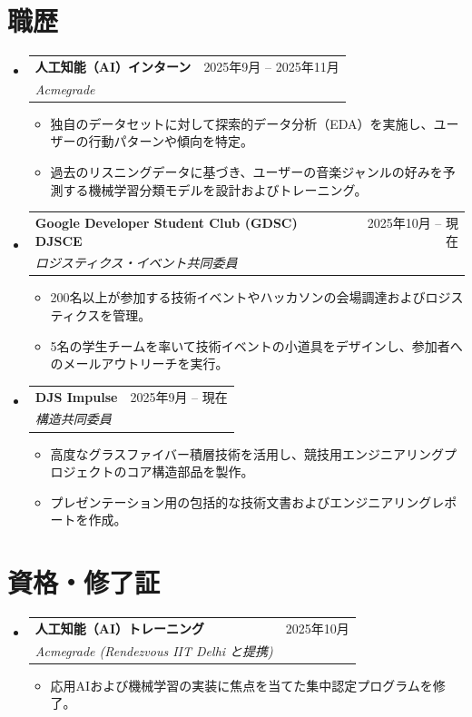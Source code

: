 \documentclass[letterpaper,11pt]{article}
\makeatletter
\newcommand{\resumeItem}[1]{
  \item\small{#1}
}
\newcommand{\resumeSubheading}[4]{
  \item
    \begin{tabular*}{0.97\textwidth}[t]{l@{\extracolsep{\fill}}r}
      \textbf{#1} & #2 \\[2pt]
      \textit{\small#3} & \textit{\small #4} \\
    \end{tabular*}\vspace{1pt}
}
\newcommand{\resumeSubHeadingListStart}{\begin{itemize}[leftmargin=0.15in, label={}, itemsep=5pt, parsep=0pt]}
\newcommand{\resumeSubHeadingListEnd}{\end{itemize}}
\newcommand{\resumeItemListStart}{\begin{itemize}[itemsep=2pt, parsep=0pt, topsep=0pt, partopsep=0pt]}
\newcommand{\resumeItemListEnd}{\end{itemize}}
\makeatother
\begin{document}
\section{職歴}
  \resumeSubHeadingListStart
    \resumeSubheading
      {人工知能（AI）インターン}{2025年9月 -- 2025年11月}
      {Acmegrade}{}
      \resumeItemListStart
        \resumeItem{独自のデータセットに対して探索的データ分析（EDA）を実施し、ユーザーの行動パターンや傾向を特定。}
        \resumeItem{過去のリスニングデータに基づき、ユーザーの音楽ジャンルの好みを予測する機械学習分類モデルを設計およびトレーニング。}
      \resumeItemListEnd
    \resumeSubheading
      {Google Developer Student Club (GDSC) DJSCE}{2025年10月 -- 現在}
      {ロジスティクス・イベント共同委員}{}
      \resumeItemListStart
        \resumeItem{200名以上が参加する技術イベントやハッカソンの会場調達およびロジスティクスを管理。}
        \resumeItem{5名の学生チームを率いて技術イベントの小道具をデザインし、参加者へのメールアウトリーチを実行。}
      \resumeItemListEnd
    \resumeSubheading
      {DJS Impulse}{2025年9月 -- 現在}
      {構造共同委員}{}
      \resumeItemListStart
        \resumeItem{高度なグラスファイバー積層技術を活用し、競技用エンジニアリングプロジェクトのコア構造部品を製作。}
        \resumeItem{プレゼンテーション用の包括的な技術文書およびエンジニアリングレポートを作成。}
      \resumeItemListEnd
  \resumeSubHeadingListEnd

\section{資格・修了証}
  \resumeSubHeadingListStart
    \resumeSubheading
      {人工知能（AI）トレーニング}{2025年10月}
      {Acmegrade (Rendezvous IIT Delhi と提携)}{}
      \resumeItemListStart
        \resumeItem{応用AIおよび機械学習の実装に焦点を当てた集中認定プログラムを修了。}
      \resumeItemListEnd
  \resumeSubHeadingListEnd
\end{document}

